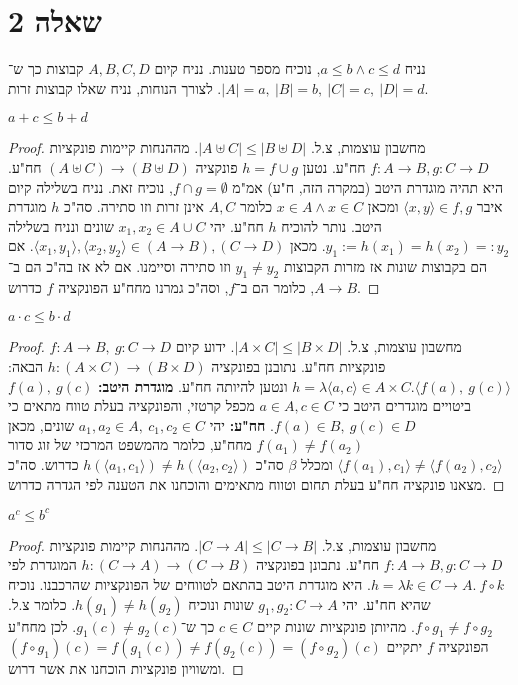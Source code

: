 \documentclass[]{article}
\newcommand\ra    {\rangle}
\newcommand\la    {\langle}
\begin{document}
	\section*{שאלה 2}
	נניח $ a \le b \land c \le d $, נוכיח מספר טענות. נניח קיום $ A, B, C, D $ קבוצות כך ש־$ |A| = a, \ |B| = b, \ |C| = c, \ |D| = d $. לצורך הנוחות, נניח שאלו קבוצות זרות. 
	\begin{hebenum}[(a)]
		\item $ a + c \le b + d $ \begin{proof}
			מחשבון עוצמות, צ.ל. $ |A \uplus C| \le |B \uplus D| $. מההנחות קיימות פונקציות $ f \colon A \to B, g \colon C \to D $ חח"ע. נטען $ h = f \cup g $ פונקציה $ (A \uplus C) \to (B \uplus D) $ חח"ע. היא תהיה מוגדרת היטב (במקרה הזה, ח"ע) אמ"מ $ f \cap g = \emptyset $, נוכיח זאת. נניח בשלילה קיום איבר $ \la x, y \ra \in f, g $ ומכאן $ x \in A \land x \in C $ כלומר $ A, C $ אינן זרות וזו סתירה. סה"כ $ h $ מוגדרת היטב. נותר להוכיח $ h $ חח"ע. יהי $ x_1, x_2 \in A \cup C $ שונים ונניח בשלילה $ y_1 := h(x_1) = h(x_2) =: y_2 $. מכאן $ \la x_1, y_1 \ra, \la x_2, y_2 \ra \in (A \to B), (C \to D) $. אם הם בקבוצות שונות אז מזרות הקבוצות $ y_1 \neq y_2 $ וזו סתירה וסיימנו. אם לא אז בה"כ הם ב־$ A \to B $, כלומר הם ב־$ f $, וסה"כ גמרנו מחח"ע הפונקציה $ f $ כדרוש. 
		\end{proof}
	\item $ a \cdot c \le b \cdot d $ \begin{proof}
		מחשבון עוצמות, צ.ל. $ |A \times C| \le |B \times D| $. ידוע קיום $ f \colon A \to B, \ g \colon C \to D $ פונקציות חח"ע. נתובנן בפונקציה $ h \colon (A \times C) \to (B \times D) $ הבאה: $ h = \lambda \la a, c \ra \in A \times C. \la f(a), \ g(c) \ra $ ונטען להיותה חח"ע. \textbf{מוגדרת היטב: } $ f(a), \ g(c) $ ביטויים מוגדרים היטב כי $ a \in A, c \in C $ מכפל קרטזי, והפונקציה בעלת טווח מתאים כי $ f(a) \in B, \ g(c) \in D $. \textbf{חח"ע: } יהי $ a_1, a_2 \in A, \ c_1, c_2 \in C $ שונים, מכאן $ f(a_1) \neq f(a_2) $ מחח"ע, כלומר מהמשפט המרכזי של זוג סדור $ \la f(a_1), c_1 \ra \neq \la f(a_2), c_2 \ra $ ומכלל $ \beta $ סה"כ $ h(\la a_1, c_1 \ra) \neq h(\la a_2, c_2 \ra) $ כדרוש. סה"כ מצאנו פונקציה חח"ע בעלת תחום וטווח מתאימים והוכחנו את הטענה לפי הגדרה כדרוש. 
	\end{proof}
	\item $ a^c \le b^c $ \begin{proof}
		מחשבון עוצמות, צ.ל. $ |C \to A| \le |C \to B| $. מההנחות קיימות פונקציות $ f \colon A \to B, g \colon C \to D $ חח"ע. נתבונן בפונקציה $ h \colon (C \to A) \to (C \to B) $ המוגדרת לפי $ h = \lambda k \in C \to A. \ f \circ k $. היא מוגדרת היטב בהתאם לטווחים של הפונקציות שהרכבנו. נוכיח שהיא חח"ע. יהי $ g_1, g_2 \colon C \to A $ שונות ונוכיח $ h(g_1) \neq h(g_2) $. כלומר צ.ל. $ f \circ g_1 \neq f \circ g_2 $. מהיותן פונקציות שונות קיים $ c \in C $ כך ש־$ g_1(c) \neq g_2(c) $. לכן מחח"ע הפונקציה $ f $ יתקיים $ (f \circ g_1)(c) = f(g_1(c)) \neq f(g_2(c)) = (f \circ g_2)(c) $ ומשוויון פונקציות הוכחנו את אשר דרוש. 
	\end{proof}
	\end{hebenum}
\end{document}
